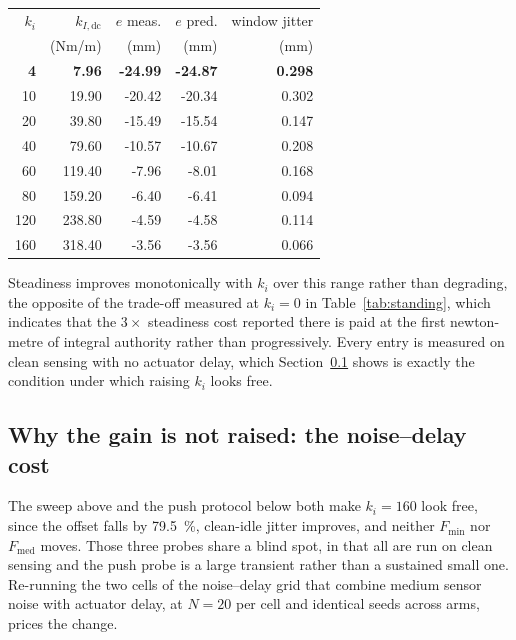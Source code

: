 \documentclass[a4paper,fleqn]{cas-dc}
\begin{document}
\begin{center}\footnotesize
\begin{tabular}{rrrrr}
\hline
$k_i$ & $k_{I,\text{dc}}$ & $e$ meas. & $e$ pred. & window jitter \\
 & (Nm/m) & (mm) & (mm) & (mm) \\
\hline
\textbf{4} & \textbf{7.96} & \textbf{-24.99} & \textbf{-24.87} & \textbf{0.298} \\
10 & 19.90 & -20.42 & -20.34 & 0.302 \\
20 & 39.80 & -15.49 & -15.54 & 0.147 \\
40 & 79.60 & -10.57 & -10.67 & 0.208 \\
60 & 119.40 & -7.96 & -8.01 & 0.168 \\
80 & 159.20 & -6.40 & -6.41 & 0.094 \\
120 & 238.80 & -4.59 & -4.58 & 0.114 \\
160 & 318.40 & -3.56 & -3.56 & 0.066 \\
\hline
\end{tabular}
\end{center}

Steadiness improves monotonically with $k_i$ over this range rather than
degrading, the opposite of the trade-off measured at $k_i{=}0$ in
Table~\ref{tab:standing}, which indicates that the $3{\times}$ steadiness cost
reported there is paid at the first newton-metre of integral authority rather
than progressively. Every entry is measured on clean sensing with no actuator
delay, which Section~\ref{sec:parking_ki_cost} shows is exactly the condition
under which raising $k_i$ looks free.

\subsection{Why the gain is not raised: the noise--delay cost}
\label{sec:parking_ki_cost}

The sweep above and the push protocol below both make $k_i{=}160$ look free,
since the offset falls by \SI{79.5}{\percent}, clean-idle jitter improves, and
neither $F_{\min}$ nor $F_{\text{med}}$ moves. Those three probes share a blind
spot, in that all are run on clean sensing and the push probe is a large
transient rather than a sustained small one. Re-running the two cells of
the noise--delay grid that combine medium sensor noise with actuator delay,
at $N{=}20$ per cell and identical seeds across arms, prices the change.
\end{document}
